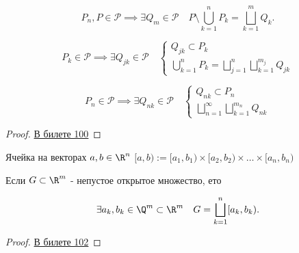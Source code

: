 \begin{theorem}\label{thm:semi_ops} \thmslashn

    \[ P_{n}, P\in \mathcal{P} \implies \exists{Q_{m}\in \mathcal{P}}\quad P \setminus \bigcup\limits_{k=1}^{n} P_{k} = \bigsqcup\limits_{k=1}^{m} Q_{k}  .\]

    \begin{equation*}
        P_{k} \in \mathcal{P} \implies \exists{Q_{jk}\in \mathcal{P}}\quad
        \begin{cases}
            Q_{jk} \subset P_{k}\\
            \bigcup\limits_{k=1}^{n} P_{k} = \bigsqcup\limits_{j=1}^{n} \bigsqcup\limits_{k=1}^{m_{j}} Q_{jk} 
        \end{cases}
    \end{equation*}

    \begin{equation*}
        P_{n}\in \mathcal{P} \implies \exists{Q_{nk}\in \mathcal{P}}\quad
        \begin{cases}
            Q_{nk} \subset P_{n}\\
            \bigsqcup\limits_{n=1}^{\infty} \bigsqcup\limits_{k=1}^{m_{n}} Q_{nk} 
        \end{cases}
    \end{equation*}
    \begin{proof} \thmslashn
    
        \href{\questionsurl}{В билете 100}
    \end{proof}
\end{theorem}
\begin{definition}[Ячейка] \thmslashn 

    Ячейка на векторах $a, b\in \R^{n}$ $[a, b) := [a_1, b_1) \times [a_2, b_2) \times \ldots \times [a_{n}, b_{n})$
\end{definition}
\begin{theorem} \thmslashn

    Если $G \subset \R^{m}$ - непустое открытое множество, ето 

    \[ \exists{a_{k}, b_{k}\in \Q^{m} \subset \R^{m}}\quad G = \bigsqcup\limits_{k=1}^{n} [a_{k}, b_{k})    .\] 
    \begin{proof} \thmslashn
    
        \href{\questionsurl}{В билете 102}
    \end{proof}
\end{theorem}



\undef\questionsurl
